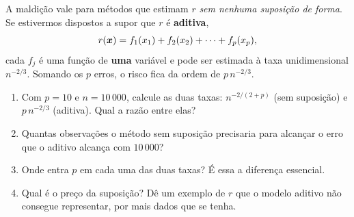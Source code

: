 \documentclass[11pt,a4paper]{article}
\begin{document}
\begin{exercicio}
A maldição vale para métodos que estimam $r$ \emph{sem nenhuma suposição de
forma}. Se estivermos dispostos a supor que $r$ é \textbf{aditiva},
\[
  r(\bm{x}) = f_1(x_1) + f_2(x_2) + \dots + f_p(x_p),
\]
cada $f_j$ é uma função de \textbf{uma} variável e pode ser estimada à taxa
unidimensional $n^{-2/3}$. Somando os $p$ erros, o risco fica da ordem de
$p\,n^{-2/3}$.
\begin{enumerate}[label=(\alph*),leftmargin=1.1cm]
  \item Com $p=10$ e $n=10\,000$, calcule as duas taxas: $n^{-2/(2+p)}$ (sem
        suposição) e $p\,n^{-2/3}$ (aditiva). Qual a razão entre elas?
  \item Quantas observações o método sem suposição precisaria para alcançar o
        erro que o aditivo alcança com $10\,000$?
  \item Onde entra $p$ em cada uma das duas taxas? É essa a diferença essencial.
  \item Qual é o preço da suposição? Dê um exemplo de $r$ que o modelo aditivo
        não consegue representar, por mais dados que se tenha.
\end{enumerate}
\end{exercicio}
\end{document}
